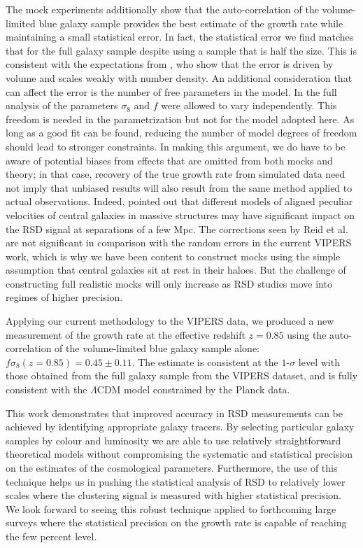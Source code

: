 \documentclass[longauth]{aa}
\begin{document}
The mock experiments additionally show that the auto-correlation of the volume-limited blue galaxy sample provides the best estimate of the growth rate while maintaining a small statistical error.  In fact, the statistical error we find matches that for the full galaxy sample \citep{pezzotta16} despite using a sample that is half the size.  This is consistent with the expectations from \citet{bianchi12}, who show that the error is driven by volume and scales weakly with number density.  An additional consideration that can affect the error is the number of free parameters in the model. In the full analysis of \citet{pezzotta16} the parameters $\sigma_8$ and $f$ were allowed to vary independently.  This freedom is needed in the \citet{taruya10} parametrization but not for the \citet{scoccimarro04} model adopted here.  As long as a good fit can be found, reducing the number of model degrees of freedom should lead to stronger constraints. In making this argument, we do have to be aware of potential biases from effects that are omitted from both mocks and theory; in that case, recovery of the true growth rate from simulated data need not imply that unbiased results will also result from the same method applied to actual observations. Indeed, \citet{reid14} pointed out that different models of aligned peculiar velocities of central galaxies in massive structures may have significant impact on the RSD signal at separations of a few Mpc. The corrections seen by Reid et al. are not significant in comparison with the random errors in the current VIPERS work, which is why we have been content to construct mocks using the simple assumption that central galaxies sit  at rest in their haloes. But the challenge of constructing full realistic mocks will only increase as RSD studies move into regimes of higher precision.

Applying our current methodology to the VIPERS data, we produced a new measurement of the growth rate at the effective redshift $z=0.85$ using the auto-correlation of the volume-limited blue galaxy sample alone: $f\sigma_8(z=0.85)=0.45\pm0.11$.  The estimate is consistent at the $1\text{-}\sigma$ level with those obtained from the full galaxy sample from the VIPERS dataset, and is fully consistent with the $\Lambda$CDM model constrained by the Planck data.

This work demonstrates that improved accuracy in RSD measurements can be achieved by identifying appropriate galaxy tracers. By selecting particular galaxy samples by colour and luminosity we are able to use relatively straightforward theoretical models without compromising the systematic and statistical precision on the estimates of the cosmological parameters. Furthermore, the use of this technique helps us in pushing the statistical analysis of RSD to relatively lower scales where the clustering signal is measured with higher statistical precision. We look forward to seeing this robust technique applied to forthcoming large surveys where the statistical precision on the growth rate is capable of reaching the few percent level.
\end{document}
